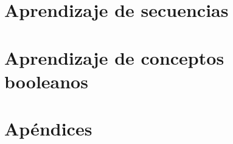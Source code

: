 \documentclass[a4paper,12pt,oneside]{book}
\begin{document}
    \part{Aprendizaje de secuencias}
        
        
        
    \part{Aprendizaje de conceptos booleanos}
        
        
        
         
    \part{Apéndices}
        \appendix
        
        
        
    
    
    
\end{document}
